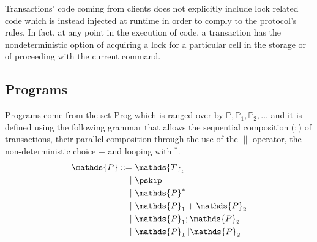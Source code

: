 Transactions' code coming from clients does not explicitly include lock related code which is instead injected at runtime in order to comply to the protocol's rules. In fact, at any point in the execution of code, a transaction has the nondeterministic option of acquiring a lock for a particular cell in the storage or of proceeding with the current command.

\subsection{Programs}

Programs come from the set \textsf{Prog} which is ranged over by $\mathds{P}, \mathds{P}_1, \mathds{P}_2, \ldots$ and it is defined using the following grammar that allows the sequential composition ($;$) of transactions, their parallel composition through the use of the $\|$ operator, the non-deterministic choice $+$ and looping with $^*$.
\begin{align*}
\mathds{P} ::=&
\ \mathds{T}_\iota \\
|&\ \pskip \\
|&\ \mathds{P}^* \\
|&\ \mathds{P}_1 + \mathds{P}_2 \\
|&\ \mathds{P}_1; \mathds{P}_2 \\
|&\ \mathds{P}_1 \| \mathds{P}_2
\end{align*}
